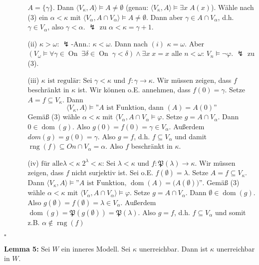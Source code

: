 \documentclass[a4paper,fontsize=11pt]{scrartcl}
\newcommand{\rng}{\operatorname{rng}}
\newcommand{\On}{\operatorname{On}}
\newcommand{\dom}{\operatorname{dom}}
\begin{document}
\begin{itemize}
\begin{itemize}
    $A=\{\gamma\}$.  Dann $\langle V_{\kappa},A\rangle\models
    A\neq\emptyset$ (genau: $\langle V_{\kappa},A\rangle\models
    \exists x\; A(x)$). Wähle nach (3) ein $\alpha<\kappa$ mit
    $\langle V_{\alpha}, A\cap V_{\alpha}\rangle\models A\neq
    \emptyset$.  Dann aber $\gamma \in A\cap V_{\alpha}$, d.h. $\gamma
    \in V_{\alpha}$, also $\gamma<\alpha$.  $\lightning$ zu
    $\alpha<\kappa=\gamma+1$.
  \item[(ii)] $\kappa>\omega$: $\lightning$-Ann.: $\kappa<\omega$.
    Dann nach $(i)$ $\kappa=\omega$.  Aber
    $(V_{\omega}\models\forall\gamma\in\On\; \exists \delta\in\On\;
    \gamma<\delta)\land \exists x\; x=x$ %
    alle $n<\omega$: $V_n\models \neg\varphi$.  $\lightning$ zu (3).
  \item[(iii)] $\kappa\mbox{ ist regulär}$: Sei $\gamma<\kappa$ und
    $f\colon\gamma\to\kappa$.  Wir müssen zeigen, dass $f$ beschränkt
    in $\kappa$ ist.  Wir können o.E. annehmen, dass $f(0)=\gamma$.
    Setze $A=f\subseteq V_{\kappa}$.  Dann \[\langle
    V_{\kappa},A\rangle\models \mbox{''$A$ ist Funktion, dann
      $(A)=A(0)$''}\] Gemäß (3) wähle $\alpha<\kappa$ mit $\langle
    V_{\alpha}, A\cap V_{\alpha}\models \varphi$.  Setze $g=A\cap
    V_{\alpha}$.  Dann $0\in\dom(g)$.  Also $g(0)=f(0)=\gamma \in
    V_{\alpha}$.  Außerdem $dom(g)=g(0)=\gamma$.  Also $g=f$,
    d.h. $f\subseteq V_{\alpha}$ und damit $\rng(f)\subseteq On\cap
    V_{\alpha}=\alpha$.  Also $f$ beschränkt in $\kappa$.
  \item[(iv)] $\mbox{für alle} \lambda<\kappa \; 2^{\lambda}<\kappa$:
    Sei $\lambda<\kappa$ und $f\colon \mathfrak P(\lambda)\to\kappa$.
    Wir müssen zeigen, dass $f$ nicht surjektiv ist.  Sei
    o.E. $f(\emptyset)=\lambda$.  Setze $A=f\subseteq V_{\kappa}$.
    Dann $\langle V_{\kappa}, A\rangle\models \mbox{''$A$ ist
      Funktion, $\dom(A)=\mathfrak(A(\emptyset))$''}$.  Gemäß (3)
    wähle $\alpha<\kappa$ mit $\langle V_{\alpha}, A\cap
    V_{\alpha}\rangle\models\varphi$.  Setze $g=A\cap V_{\alpha}$.
    Dann $\emptyset\in\dom(g)$.  Also
    $g(\emptyset)=f(\emptyset)=\lambda\in V_{\alpha}$.  Außerdem
    $\dom(g)=\mathfrak P(g(\emptyset)) = \mathfrak P(\lambda)$.  Also
    $g=f$, d.h. $f\subseteq V_{\alpha}$ und somit
    z.B. $\alpha\not\in\rng(f)$
  \end{itemize}
\end{itemize}
\hfill $\square$

{\bf Lemma 5:} Sei $W$ ein inneres Modell. Sei $\kappa$
unerreichbar. Dann ist $\kappa$ unerreichbar in $W$.
\end{document}

